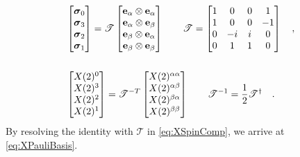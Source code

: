 \begin{subequations}
\begin{align}
\label{eq:BasisTrans}
&\begin{bmatrix}
  \pauli{0} \\
  \pauli{3} \\
  \pauli{2} \\
  \pauli{1} 
\end{bmatrix} = \mathscr{T} 
\begin{bmatrix}
  \mathbf{e}_\alpha \otimes \mathbf{e}_\alpha  \\
  \mathbf{e}_\alpha \otimes \mathbf{e}_\beta  \\
  \mathbf{e}_\beta  \otimes \mathbf{e}_\alpha   \\
  \mathbf{e}_\beta  \otimes \mathbf{e}_\beta
\end{bmatrix} \qquad
%
\mathscr{T} = 
\begin{bmatrix}
1 &  0 & 0 &  1 \\
1 &  0 & 0 & -1 \\
0 & -i & i &  0 \\
0 &  1 & 1 &  0 \\
\end{bmatrix} \quad, \\
\nonumber\\
\label{eq:CompTrans}
&\begin{bmatrix}
  \spinor{2}{X}^0 \\
  \spinor{2}{X}^3 \\
  \spinor{2}{X}^2 \\
  \spinor{2}{X}^1
\end{bmatrix} = \mathscr{T}^{-T} 
\begin{bmatrix}
  \spinor{2}{X}^{\alpha \alpha}  \\
  \spinor{2}{X}^{\alpha \beta} \\
  \spinor{2}{X}^{\beta  \alpha}   \\
  \spinor{2}{X}^{\beta  \beta}
\end{bmatrix} \qquad
%
\mathscr{T}^{-1} = \frac{1}{2} \mathscr{T}^\dagger \quad.
\end{align}
\end{subequations}
By resolving the identity with $\mathscr{T}$ in \cref{eq:XSpinComp}, we arrive at \cref{eq:XPauliBasis}.

